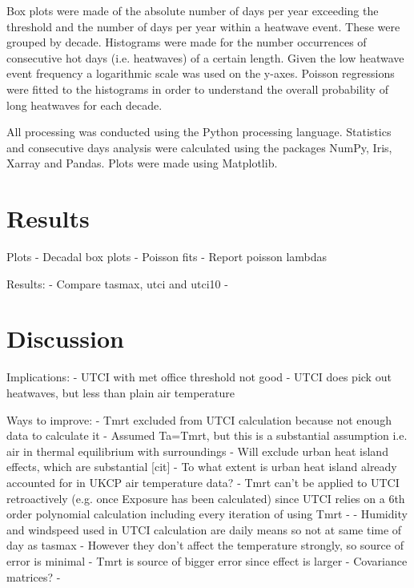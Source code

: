 \documentclass[10pt,letterpaper]{article}
\begin{document}
Box plots were made of the absolute number of days per year exceeding the threshold and the number of days per year within a heatwave event. 
These were grouped by decade.
Histograms were made for the number occurrences of consecutive hot days (i.e. heatwaves) of a certain length.
Given the low heatwave event frequency a logarithmic scale was used on the y-axes.
Poisson regressions were fitted to the histograms in order to understand the overall probability of long heatwaves for each decade.


All processing was conducted using the Python processing language.
Statistics and consecutive days analysis were calculated using the packages NumPy, Iris, Xarray and Pandas.
Plots were made using Matplotlib.











\section*{Results}



Plots
- Decadal box plots
- Poisson fits
- Report poisson lambdas

Results:
- Compare tasmax, utci and utci10
- 

\section*{Discussion}

Implications:
- UTCI with met office threshold not good
- UTCI does pick out heatwaves, but less than plain air temperature

Ways to improve:
- Tmrt excluded from UTCI calculation because not enough data to calculate it
    - Assumed Ta=Tmrt, but this is a substantial assumption i.e. air in thermal equilibrium with surroundings
    - Will exclude urban heat island effects, which are substantial [cit]
    - To what extent is urban heat island already accounted for in UKCP air temperature data?
    - Tmrt can't be applied to UTCI retroactively (e.g. once Exposure has been calculated) since UTCI relies on a 6th order polynomial calculation including every iteration of using Tmrt
    - \cite{Weihs2018}
- Humidity and windspeed used in UTCI calculation are daily means so not at same time of day as tasmax
    - However they don't affect the temperature strongly, so source of error is minimal
    - Tmrt is source of bigger error since effect is larger
    - Covariance matrices?
- 
\end{document}

